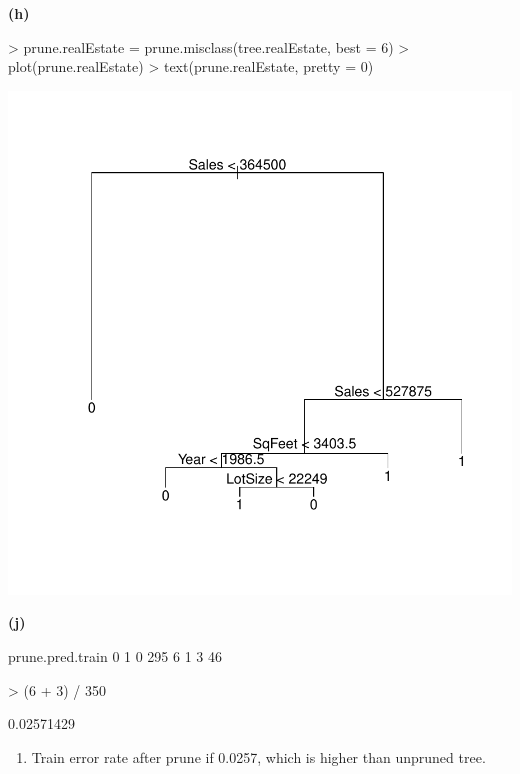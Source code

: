 \documentclass[a4paper]{article}
\renewcommand{\part}[1] {\vspace{.10in} {\bf (#1)}}
\begin{document}
\part{h}
\begin{Schunk}
\begin{Sinput}
> prune.realEstate = prune.misclass(tree.realEstate, best = 6)
> plot(prune.realEstate)
> text(prune.realEstate, pretty = 0)
\end{Sinput}
\end{Schunk}
\includegraphics{tree-1h}

\part{j}
\begin{Schunk}
\begin{Soutput}
prune.pred.train   0   1
               0 295   6
               1   3  46
\end{Soutput}
\begin{Sinput}
> (6 + 3) / 350
\end{Sinput}
\begin{Soutput}
[1] 0.02571429
\end{Soutput}
\end{Schunk}
{\color{red}
\begin{enumerate}
\item Train error rate after prune if 0.0257, which is higher than unpruned tree.
\end{enumerate}
}
\end{document}

